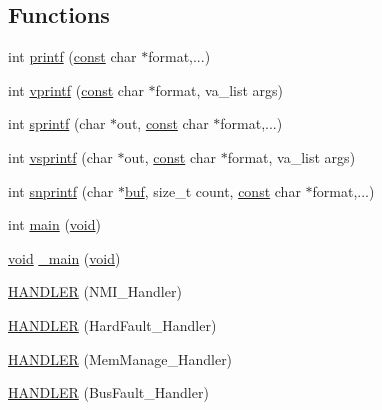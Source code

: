 \subsection*{Functions}
\begin{DoxyCompactItemize}
\item 
int \hyperlink{group___p_i_o_s_ga98631211a4a8aee62f572375d5b637be}{printf} (\hyperlink{group___n_a_m_e_ga7ae6d0e43244213b34de2c2b9aa30da6}{const} char $\ast$format,...)
\item 
int \hyperlink{group___p_i_o_s_gaae4ab8b56862ed0a04505cafb8a05112}{vprintf} (\hyperlink{group___n_a_m_e_ga7ae6d0e43244213b34de2c2b9aa30da6}{const} char $\ast$format, va\-\_\-list args)
\item 
int \hyperlink{group___p_i_o_s_gaa0649118bc3728b2a62af0b47606ff51}{sprintf} (char $\ast$out, \hyperlink{group___n_a_m_e_ga7ae6d0e43244213b34de2c2b9aa30da6}{const} char $\ast$format,...)
\item 
int \hyperlink{group___p_i_o_s_ga7408e892dd48c6ce39b5821d917a3dd2}{vsprintf} (char $\ast$out, \hyperlink{group___n_a_m_e_ga7ae6d0e43244213b34de2c2b9aa30da6}{const} char $\ast$format, va\-\_\-list args)
\item 
int \hyperlink{group___p_i_o_s_gaf78a52a59a43dc156963dbbab958a468}{snprintf} (char $\ast$\hyperlink{mavlink__helpers_8h_af5c51bef7cca88bcb22f0517fdb06153}{buf}, size\-\_\-t count, \hyperlink{group___n_a_m_e_ga7ae6d0e43244213b34de2c2b9aa30da6}{const} char $\ast$format,...)
\item 
int \hyperlink{group___p_i_o_s_ga840291bc02cba5474a4cb46a9b9566fe}{main} (\hyperlink{group___n_a_m_e_ga18028b8badbf1ea7e704ccac3c488e82}{void})
\item 
\hyperlink{group___n_a_m_e_ga18028b8badbf1ea7e704ccac3c488e82}{void} \hyperlink{group___p_i_o_s_gabaa8f446abb569a6f850a328569bec9f}{\-\_\-main} (\hyperlink{group___n_a_m_e_ga18028b8badbf1ea7e704ccac3c488e82}{void})
\item 
\hyperlink{group___p_i_o_s_ga22781b76899c3e04d207a6991cc99bf4}{H\-A\-N\-D\-L\-E\-R} (N\-M\-I\-\_\-\-Handler)
\item 
\hyperlink{group___p_i_o_s_ga3e5203ca6ee79d2c3590d430095858ba}{H\-A\-N\-D\-L\-E\-R} (Hard\-Fault\-\_\-\-Handler)
\item 
\hyperlink{group___p_i_o_s_ga613a3f3451967f46994b6cda45edb3a1}{H\-A\-N\-D\-L\-E\-R} (Mem\-Manage\-\_\-\-Handler)
\item 
\hyperlink{group___p_i_o_s_gaa3b3d1c4145924c2bcb1f6ecbbb65de9}{H\-A\-N\-D\-L\-E\-R} (Bus\-Fault\-\_\-\-Handler)
\item 

\end{DoxyCompactItemize}
